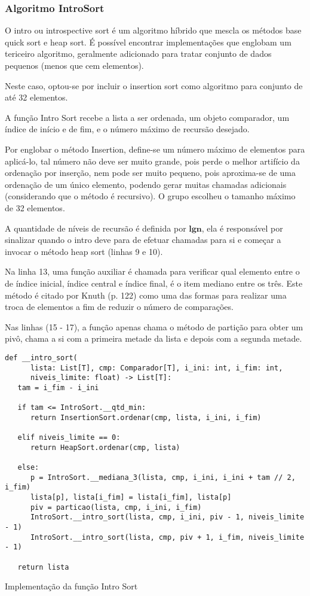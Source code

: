 \documentclass[a4paper,12pt]{scrartcl}
\begin{document}
\subsubsection{Algoritmo IntroSort}

O intro ou introspective sort é um algoritmo híbrido que mescla os métodos base quick sort e heap sort\cite{musser}. É possível encontrar implementações que englobam um tericeiro algoritmo, geralmente adicionado para tratar conjunto de dados pequenos (menos que cem elementos).

Neste caso, optou-se por incluir o insertion sort como algoritmo para conjunto de até 32 elementos.

A função Intro Sort recebe a lista a ser ordenada, um objeto comparador, um índice de início e de fim, e o número máximo de recursão desejado.

Por englobar o método Insertion, define-se um número máximo de elementos para aplicá-lo, tal número não deve ser muito grande, pois perde o melhor artifício da ordenação por inserção, nem pode ser muito pequeno, pois aproxima-se de uma ordenação de um único elemento, podendo gerar muitas chamadas adicionais (considerando que o método é recursivo). O grupo escolheu o tamanho máximo de 32 elementos.

A quantidade de níveis de recursão é definida por $\boldsymbol{lg n}$, ela é responsável por sinalizar quando o intro deve para de efetuar chamadas para si e começar a invocar o método heap sort (linhas 9 e 10).

Na linha 13, uma função auxiliar é chamada para verificar qual elemento entre o de índice inicial, índice central e índice final, é o item mediano entre os três. Este método é citado por Knuth (p. 122) como uma das formas para realizar uma troca de elementos a fim de reduzir o número de comparações.

Nas linhas (15 - 17), a função apenas chama o método de partição para obter um pivô, chama a si com a primeira metade da lista e depois com a segunda metade.

\begin{listing}[H]
\begin{verbatim}
def __intro_sort(
      lista: List[T], cmp: Comparador[T], i_ini: int, i_fim: int,
      niveis_limite: float) -> List[T]:
   tam = i_fim - i_ini

   if tam <= IntroSort.__qtd_min:
      return InsertionSort.ordenar(cmp, lista, i_ini, i_fim)

   elif niveis_limite == 0:
      return HeapSort.ordenar(cmp, lista)

   else:
      p = IntroSort.__mediana_3(lista, cmp, i_ini, i_ini + tam // 2, i_fim)
      lista[p], lista[i_fim] = lista[i_fim], lista[p]
      piv = particao(lista, cmp, i_ini, i_fim)
      IntroSort.__intro_sort(lista, cmp, i_ini, piv - 1, niveis_limite - 1)
      IntroSort.__intro_sort(lista, cmp, piv + 1, i_fim, niveis_limite - 1)

   return lista
\end{verbatim}
\caption{\footnotesize{Implementação da função Intro Sort}}
\end{listing}
\end{document}
